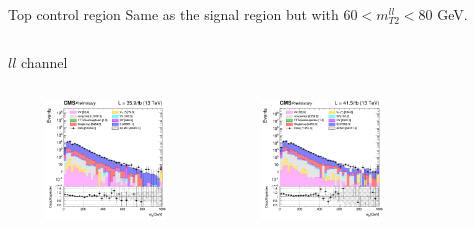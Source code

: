 \documentclass[8pt]{beamer}
\begin{document}
\begin{frame}{Top control region}
\justifying
Same as the signal region but with $60 < m_{T2}^{ll} < 80$ GeV. \vfill

\begin{columns}
\begin{column}{1.09\textwidth}
\begin{block}{\centering $ll$ channel}\end{block}
\end{column}
\end{columns} \vspace{-5pt}

\begin{columns}
		\begin{column}{0.33\textwidth}
			\begin{center}
			\vspace{-8pt}
			\begin{block}{}\end{block}\vspace{10pt}
     			\includegraphics[width=1.0\textwidth, height=90pt]{figs/2016/log_cratio_ttbarCR_ll_mll.png}
    		\end{center}		
		\end{column} 
		\begin{column}{0.33\textwidth}
			\begin{center}
			\vspace{-8pt}
			\begin{block}{}\end{block}\vspace{10pt}
     			\includegraphics[width=1.0\textwidth, height=90pt]{figs/2017/log_cratio_ttbarCR_ll_mll.png}
    		\end{center}		
		\end{column} 
		\begin{column}{0.33\textwidth}

\end{column}
\end{columns}
\end{frame}
\end{document}
